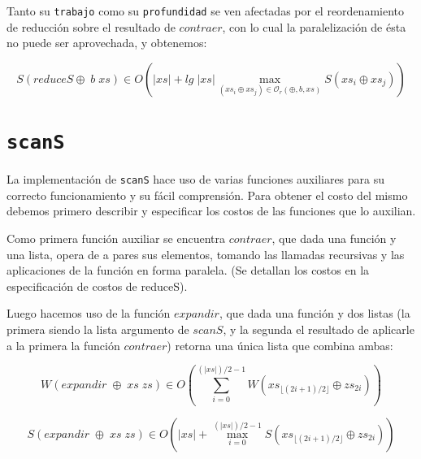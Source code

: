 \documentclass[a4paper,10pt]{article}
\begin{document}
\bigskip

    Tanto su \texttt{trabajo} como su \texttt{profundidad} se ven afectadas por
el reordenamiento de reducción sobre el resultado de $contraer$, con lo cual la paralelización
de ésta no puede ser aprovechada, y obtenemos:

\begin{equation*}
    S \left( reduceS \oplus \; b \; xs \right) \in
    O \left( \vert xs \vert + lg \;\vert xs \vert \max_{(xs_i \oplus xs_j) \in \mathcal{O}_r(\oplus,b,xs)} S \left( xs_i \oplus xs_j \right) \right)
\end{equation*}


\bigskip


\section*{\texttt{scanS}}

    La implementación de \texttt{scanS} hace uso de varias funciones auxiliares
para su correcto funcionamiento y su fácil comprensión. Para obtener el costo del
mismo debemos primero describir y especificar los costos de las funciones que lo 
auxilian.

    Como primera función auxiliar se encuentra $contraer$, que dada una función y
una lista, opera de a pares sus elementos, tomando las llamadas recursivas y las 
aplicaciones de la función en forma paralela. (Se detallan los costos en la
especificación de costos de reduceS).

\smallskip

    Luego hacemos uso de la función $expandir$, que dada una función y dos listas
(la primera siendo la lista argumento de $scanS$, y la segunda el resultado de aplicarle
a la primera la función $contraer$) retorna una única lista que combina ambas:

\begin{equation*}
    W \left( expandir \;\oplus \;xs \;zs \right) \in
    O \left( \sum_{i=0}^{(\vert xs \vert)/2 - 1} W \left( xs_{\lfloor (2i+1)/2 \rfloor} \oplus zs_{2i} \right) \right)
\end{equation*}

\begin{equation*}
    S \left( expandir \;\oplus \;xs \;zs \right) \in
    O \left( \vert xs \vert + \max_{i=0}^{(\vert xs \vert)/2 - 1} S \left( xs_{\lfloor (2i+1)/2 \rfloor} \oplus zs_{2i} \right) \right)
\end{equation*}

\bigskip
\end{document}
